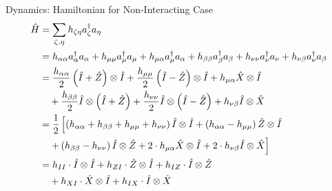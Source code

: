 \documentclass[professionalfonts]{beamer}
\newcommand{\paren}[1]{\left( #1 \right)}
\newcommand{\anio}[1]{a_{\oo{#1}}}
\newcommand{\aniu}[1]{a_{\uo{#1}}}
\newcommand{\anig}[1]{a_{\go{#1}}}
\newcommand{\creo}[1]{a^\dagger_{\oo{#1}}}
\newcommand{\creu}[1]{a^\dagger_{\uo{#1}}}
\newcommand{\creg}[1]{a^\dagger_{\go{#1}}}
\newcommand{\uo}[1]{
		\IfEqCase{#1}{
			{0}{\mu}
			{1}{\nu}
			{2}{\xi}
		}[\PackageError{uo}{Undefined option to uo: #1}{}]
}
\newcommand{\oo}[1]{
		\IfEqCase{#1}{
			{0}{\alpha}
			{1}{\beta}
			{2}{\gamma}
		}[\PackageError{unocorb}{Undefined option to unuo: #1}{}]
}
\newcommand{\go}[1]{
		\IfEqCase{#1}{
			{0}{\zeta}
			{1}{\eta}
			{2}{\iota}
			{3}{\kappa}
		}[\PackageError{unocorb}{Undefined option to go: #1}{}]
}
\begin{document}

\begin{frame}{Dynamics: Hamiltonian for Non-Interacting Case}
%
\begin{equation*}
	\begin{split}
	\hat H  &= \sum_{\go 0, \go 1}h_{\go 0 \go 1}\creg 0 \anig 1 \\
		&= {h_{\alpha\alpha}} \creo 0 \anio 0
		+ {h_{\mu\mu}} \creu 0 \aniu 0
		+ h_{\mu\alpha} \creu 0 \anio 0 
		+ {h_{\beta\beta}} \creo 1 \anio 1
		+ {h_{\nu\nu}} \creu 1 \aniu 1
		+ h_{\nu\beta} \creu 1 \anio 1
%
		\\
%
		&= \frac{h_{\alpha\alpha}}{2} \paren{\hat I + \hat Z} \otimes \hat I
		+ \frac{h_{\mu\mu}}{2} \paren{\hat I - \hat Z} \otimes \hat I
		+ h_{\mu\alpha} \hat X \otimes \hat I 
%
		\\
%
		& \quad
		+ \frac{h_{\beta\beta}}{2} \hat I \otimes \paren{\hat I + \hat Z} 
		+ \frac{h_{\nu\nu}}{2} \hat I \otimes \paren{\hat I - \hat Z} 
		+ h_{\nu\beta} \hat I \otimes \hat X
%
	\\
%
		&= 	\frac{1}{2} \left[ 
			\paren{h_{\alpha\alpha} + h_{\beta\beta} + h_{\mu\mu} + h_{\nu\nu}} \hat I \otimes \hat I 
		+	\paren{h_{\alpha\alpha} - h_{\mu\mu}} \hat Z \otimes \hat I 
	\right .
	\\
		& \quad	\left .
		+	\paren{h_{\beta\beta} - h_{\nu\nu}} \hat I \otimes \hat Z 
		+ 	2 \cdot h_{\mu\alpha} \hat X \otimes \hat I 
		+ 	2 \cdot h_{\nu\beta} \hat I \otimes \hat X
	\right]
%
	\\
%
		&=	h_{II} \cdot \hat I \otimes \hat I
		+	h_{ZI} \cdot \hat Z \otimes \hat I
		+	h_{IZ} \cdot \hat I \otimes \hat Z
	\\
		& \quad 
		+	h_{XI} \cdot \hat X \otimes \hat I
		+	h_{IX} \cdot \hat I \otimes \hat X
	\end{split}
\end{equation*}
\end{frame}

\end{document}
